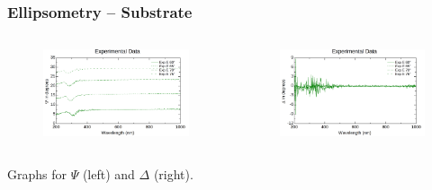 \documentclass{beamer}
\begin{document}
\begin{frame}
\frametitle{Ellipsometry -- Substrate}
\begin{columns}
\begin{figure}
\includegraphics[width=\textwidth]{sub_ellipsometry_1}
\end{figure}
\begin{figure}
\includegraphics[width=\textwidth]{sub_ellipsometry_2}
\end{figure}
\end{columns}
\begin{center}
Graphs for $\Psi$ (left) and $\Delta$ (right).
\end{center}
\end{frame}
\end{document}
